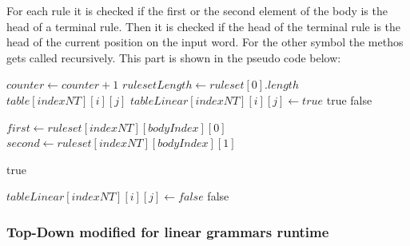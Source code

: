 \documentclass[a4paper, 11pt]{article}
\begin{document}
For each rule it is checked if the first or the second element of the body is the head of a terminal rule. Then it is checked if the head of the terminal rule is the head of the current position on the input word. For the other symbol the methos gets called recursively. This part is shown in the pseudo code below:


\begin{center}
\begin{algorithmic}[1]
\State $counter \gets counter+1$
\State $rulesetLength \gets ruleset[0].length$
	\State \Return $table[indexNT][i][j]$
\EndIf
{}
		\State $tableLinear[indexNT][i][j] \gets true$
		\State \Return true
	\EndIf
	\EndFor
	\State \Return false
\EndIf 

		\State $first \gets ruleset[indexNT][bodyIndex][0]$
		\State $second \gets ruleset[indexNT][bodyIndex][1]$
			\EndIf
			\EndIf
		\EndFor
	\EndIf
\EndFor

	\State \Return true
\EndIf

\State $tableLinear[indexNT][i][j] \gets false$
\State \Return false
\end{algorithmic}
\hrulefill
\end{center}


\subsubsection{Top-Down modified for linear grammars runtime}
\label{lineartopdown_runtime}
\end{document}
